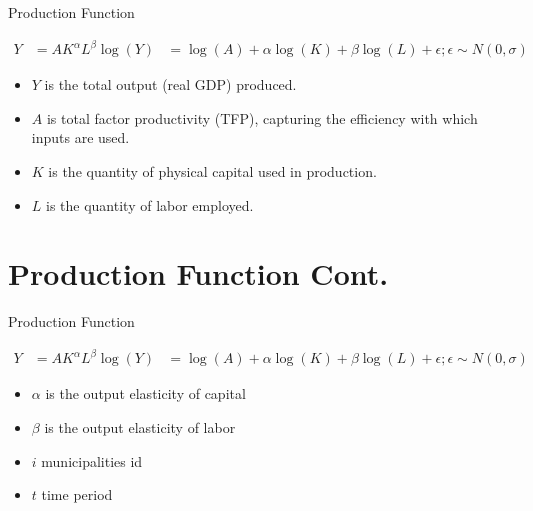 \documentclass[11pt]{beamer}
\def\\{}%
\begin{document}
\begin{frame}{Production Function}

	\[
		\begin{split}
			Y       & = A K^\alpha L^\beta                                                             \\
			\log(Y) & = \log(A) + \alpha \log(K) + \beta \log(L) +\epsilon ; \epsilon \sim N(0,\sigma)
		\end{split}
	\]

	\begin{itemize}
		\item $Y$ is the total output (real GDP) produced.
		\item $A$ is total factor productivity (TFP), capturing the efficiency with which inputs are used.
		\item $K$ is the quantity of physical capital used in production.
		\item $L$ is the quantity of labor employed.
	\end{itemize}

\end{frame}

\section{Production Function Cont.}

\begin{frame}{Production Function}

	\[
		\begin{split}
			Y       & = A K^\alpha L^\beta                                                             \\
			\log(Y) & = \log(A) + \alpha \log(K) + \beta \log(L) +\epsilon ; \epsilon \sim N(0,\sigma)
		\end{split}
	\]

	\begin{itemize}
		\item $\alpha$ is the output elasticity of capital
		\item $\beta$ is the output elasticity of labor
		\item $i$ municipalities id
		\item $t$ time period
	\end{itemize}

\end{frame}


\end{document}
